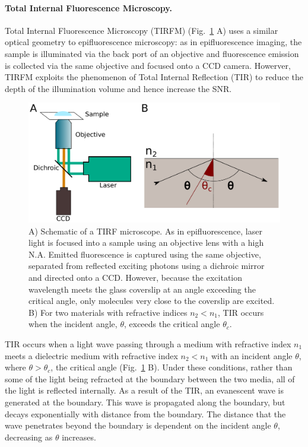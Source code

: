 \paragraph{Total Internal Fluorescence Microscopy.}
Total Internal Fluorescence Microscopy (TIRFM) (Fig.~\ref{fig:TIRF} A) uses a similar optical geometry to epifluorescence microscopy: as in epifluorescence imaging, the sample is illuminated via the back port of an objective and fluorescence emission is collected via the same objective and focused onto a CCD camera. Howerver, TIRFM exploits the phenomenon of Total Internal Reflection (TIR) to reduce the depth of the illumination volume and hence increase the SNR.

\begin{figure}
	\begin{center}
	\includegraphics*[clip=true, width=6in]{introduction/tirf.pdf}
	\caption{A) Schematic of a TIRF microscope. As in epifluorescence, laser light is focused into a sample using an objective lens with a high N.A. Emitted fluorescence is captured using the same objective, separated from reflected exciting photons using a dichroic mirror and directed onto a CCD. However, because the excitation wavelength meets the glass coverslip at an angle exceeding the critical angle, only molecules very close to the coverslip are excited. B) For two materials with refractive indices $n_2 < n_1$, TIR occurs when the incident angle, $\theta$, exceeds the critical angle $\theta_c$.}
	\label{fig:TIRF}
	\end{center}
\end{figure}

TIR occurs when a light wave passing through a medium with refractive index $n_1$ meets a dielectric medium with refractive index $n_2 < n_1$ with an incident angle $\theta$, where $\theta > \theta_c$, the critical angle (Fig.~\ref{fig:TIRF} B). Under these conditions, rather than some of the light being refracted at the boundary between the two media, all of the light is reflected internally. As a result of the TIR, an evanescent wave is generated at the boundary. This wave is propagated along the boundary, but decays exponentially with distance from the boundary. The distance that the wave penetrates beyond the boundary is dependent on the incident angle $\theta$, decreasing as $\theta$ increases. 

